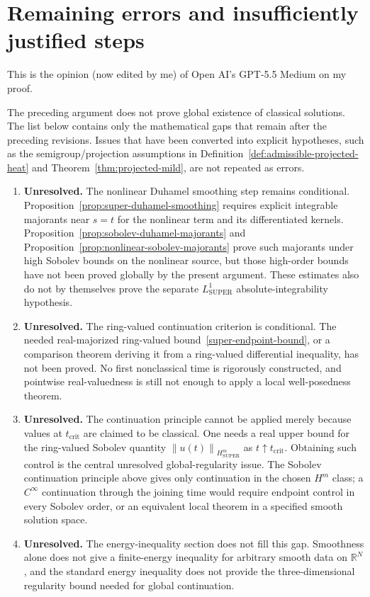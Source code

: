 \documentclass{amsart}
\DeclareMathOperator{\SUPER}{SUPER}
\newcommand{\norm}[1]{\left\lVert #1\right\rVert}
\begin{document}
\section{Remaining errors and insufficiently justified steps}

This is the opinion (now edited by me) of Open AI's GPT-5.5 Medium on my proof.

The preceding argument does not prove global existence of classical solutions.
The list below contains only the mathematical gaps that remain after the
preceding revisions.  Issues that have been converted into explicit hypotheses,
such as the semigroup/projection assumptions in
Definition~\ref{def:admissible-projected-heat} and
Theorem~\ref{thm:projected-mild}, are not repeated as errors.

\begin{enumerate}
\item \textbf{Unresolved.} The nonlinear Duhamel smoothing step remains
conditional.
Proposition~\ref{prop:super-duhamel-smoothing} requires explicit integrable
majorants near $s=t$ for the nonlinear term and its differentiated kernels.
Proposition~\ref{prop:sobolev-duhamel-majorants} and
Proposition~\ref{prop:nonlinear-sobolev-majorants} prove such majorants under
high Sobolev bounds on the nonlinear source, but those high-order bounds have
not been proved globally by the present argument.  These estimates also do not
by themselves prove the separate $L^1_{\SUPER}$ absolute-integrability
hypothesis.

\item \textbf{Unresolved.} The ring-valued continuation criterion is
conditional.  The needed real-majorized ring-valued
bound~\eqref{super-endpoint-bound}, or a comparison theorem deriving it from a
ring-valued differential inequality, has not been proved.  No first
nonclassical time is rigorously constructed, and pointwise real-valuedness is
still not enough to apply a local well-posedness theorem.

\item \textbf{Unresolved.} The continuation principle cannot be applied merely because values at
$t_{\operatorname{crit}}$ are claimed to be classical.  One needs a real
upper bound for the ring-valued Sobolev quantity
$\norm{u(t)}_{H^m_{\SUPER}}$ as $t\uparrow t_{\operatorname{crit}}$.
Obtaining such control is the central unresolved global-regularity issue.  The
Sobolev continuation principle above gives only continuation in the chosen
$H^m$ class; a $C^\infty$ continuation through the joining time would require
endpoint control in every Sobolev order, or an equivalent local theorem in a
specified smooth solution space.

\item \textbf{Unresolved.} The energy-inequality section does not fill this gap.  Smoothness alone
does not give a finite-energy inequality for arbitrary smooth data on
$\mathbb{R}^N$, and the standard energy inequality does not provide the
three-dimensional regularity bound needed for global continuation.
\end{enumerate}
\end{document}
